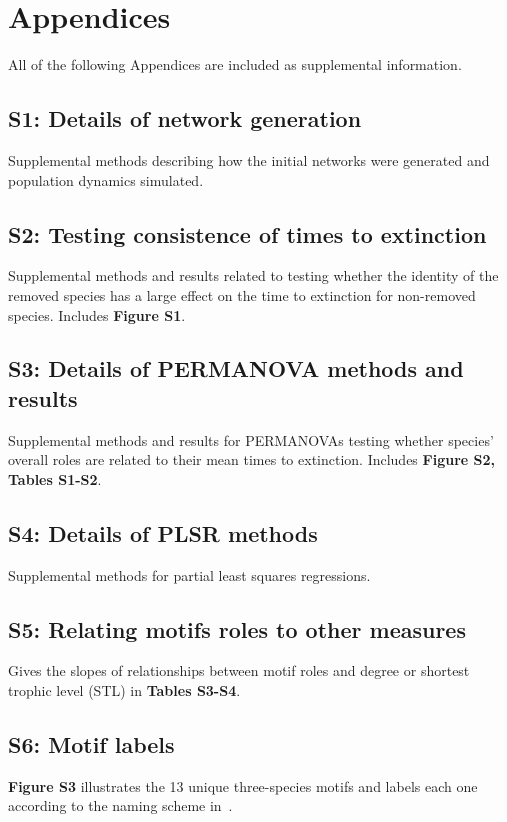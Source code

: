 \documentclass[12pt]{article}
\begin{document}
\clearpage

\section*{Appendices}

\begin{spacing}{2.0}

All of the following Appendices are included as supplemental information.

    \subsection*{S1: Details of network generation}

        Supplemental methods describing how the initial networks were generated and population dynamics simulated.

    \subsection*{S2: Testing consistence of times to extinction}
    
        Supplemental methods and results related to testing whether the identity of the removed species has a large effect on the time to extinction for non-removed species. Includes \textbf{Figure S1}.
    
    \subsection*{S3: Details of PERMANOVA methods and results}
        
        Supplemental methods and results for PERMANOVAs testing whether species' overall roles are related to their mean times to extinction. Includes \textbf{Figure S2, Tables S1-S2}.

    \subsection*{S4: Details of PLSR methods}

        Supplemental methods for partial least squares regressions. 
    
    \subsection*{S5: Relating motifs roles to other measures}
        
        Gives the slopes of relationships between motif roles and degree or shortest trophic level (STL) in \textbf{Tables S3-S4}.
        
    \subsection*{S6: Motif labels}
        
        \textbf{Figure S3} illustrates the 13 unique three-species motifs and labels each one according to the naming scheme in~\citet{Stouffer2007}.

\end{spacing}
\end{document}

